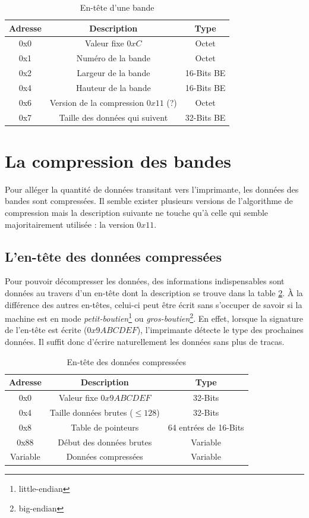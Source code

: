 \begin{table}[!ht]
\centering
\begin{tabular}{| c | c | c |}
\hline
\textbf{Adresse} & \textbf{Description} & \textbf{Type} \\
\hline
\hline
0x0 & Valeur fixe $0xC$ & Octet \\
0x1 & Numéro de la bande & Octet \\
0x2 & Largeur de la bande & 16-Bits BE \\
0x4 & Hauteur de la bande & 16-Bits BE \\
0x6 & Version de la compression $0x11$ (?) & Octet \\
0x7 & Taille des données qui suivent & 32-Bits BE \\
\hline
\end{tabular}
\caption{En-tête d'une bande}
\label{tab:entete_bande}
\end{table}

\section{La compression des bandes}
Pour alléger la quantité de données transitant vers l'imprimante, les
données des bandes sont compressées. Il semble exister plusieurs versions
de l'algorithme de compression mais la description suivante ne touche
qu'à celle qui semble majoritairement utilisée : la version
\textsc{$0x11$}.

\subsection{L'en-tête des données compressées}
Pour pouvoir décompresser les données, des informations indispensables
sont données au travers d'un en-tête dont la description se trouve
dans la table \ref{tab:entete_compression}. À la différence des autres
en-têtes, celui-ci peut être écrit sans s'occuper de savoir si la
machine est en mode \emph{petit-boutien}\footnote{little-endian} ou
\emph{gros-boutien}\footnote{big-endian}. En effet, lorsque la
signature de l'en-tête est écrite ($0x9ABCDEF$), l'imprimante détecte
le type des prochaines données. Il suffit donc d'écrire naturellement
les données sans plus de tracas.

\begin{table}[!ht]
\centering
\begin{tabular}{| c | c | c |}
\hline
\textbf{Adresse} & \textbf{Description} & \textbf{Type} \\
\hline
\hline
0x0 & Valeur fixe $0x9ABCDEF$ & 32-Bits \\
0x4 & Taille données brutes ($ \leq 128$) & 32-Bits \\
0x8 & Table de pointeurs & 64 entrées de 16-Bits \\
0x88 & Début des données brutes & Variable \\
Variable & Données compressées & Variable \\
\hline
\end{tabular}
\caption{En-tête des données compressées}
\label{tab:entete_compression}
\end{table}

